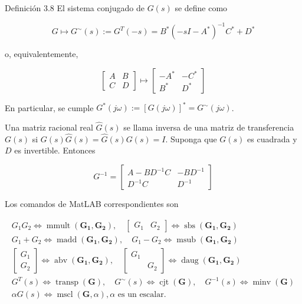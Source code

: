 Definición 3.8 El sistema conjugado de $G(s)$ se define como

$$
G \longmapsto G^{\sim}(s):=G^{T}(-s)=B^{*}\left(-s I-A^{*}\right)^{-1} C^{*}+D^{*}
$$

o, equivalentemente,

$$
\left[\begin{array}{c|c}
A & B \\
\hline C & D
\end{array}\right] \longmapsto\left[\begin{array}{c|c}
-A^{*} & -C^{*} \\
\hline B^{*} & D^{*}
\end{array}\right]
$$

En particular, se cumple $G^{*}(j \omega):=[G(j \omega)]^{*}=G^{\sim}(j \omega)$.

Una matriz racional real $\hat{G}(s)$ se llama inversa de una matriz de transferencia $G(s)$ si $G(s) \hat{G}(s)=\hat{G}(s) G(s)=I$. Suponga que $G(s)$ es cuadrada y $D$ es invertible. Entonces

$$
G^{-1}=\left[\begin{array}{c|c}
A-B D^{-1} C & -B D^{-1} \\
\hline D^{-1} C & D^{-1}
\end{array}\right]
$$

Los comandos de MatLAB correspondientes son

$$
\begin{gathered}
G_{1} G_{2} \Longleftrightarrow \operatorname{mmult}\left(\mathbf{G}_{\mathbf{1}}, \mathbf{G}_{\mathbf{2}}\right), \quad\left[\begin{array}{ll}
G_{1} & G_{2}
\end{array}\right] \Longleftrightarrow \operatorname{sbs}\left(\mathbf{G}_{\mathbf{1}}, \mathbf{G}_{\mathbf{2}}\right) \\
G_{1}+G_{2} \Longleftrightarrow \operatorname{madd}\left(\mathbf{G}_{\mathbf{1}}, \mathbf{G}_{\mathbf{2}}\right), \quad G_{1}-G_{2} \Longleftrightarrow \operatorname{msub}\left(\mathbf{G}_{\mathbf{1}}, \mathbf{G}_{\mathbf{2}}\right) \\
{\left[\begin{array}{l}
G_{1} \\
G_{2}
\end{array}\right] \Longleftrightarrow \operatorname{abv}\left(\mathbf{G}_{\mathbf{1}}, \mathbf{G}_{\mathbf{2}}\right), \quad\left[\begin{array}{cc}
G_{1} & \\
& G_{2}
\end{array}\right] \Longleftrightarrow \operatorname{daug}\left(\mathbf{G}_{\mathbf{1}}, \mathbf{G}_{\mathbf{2}}\right)} \\
G^{T}(s) \Longleftrightarrow \operatorname{transp}(\mathbf{G}), \quad G^{\sim}(s) \Longleftrightarrow \operatorname{cjt}(\mathbf{G}), \quad G^{-1}(s) \Longleftrightarrow \operatorname{minv}(\mathbf{G}) \\
\alpha G(s) \Longleftrightarrow \operatorname{mscl}(\mathbf{G}, \alpha), \alpha \text { es un escalar. }
\end{gathered}
$$

